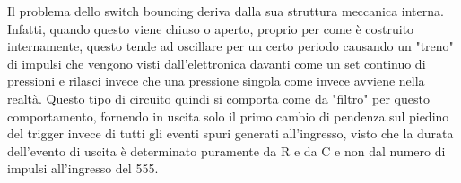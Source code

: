 Il problema dello switch bouncing deriva dalla sua struttura meccanica interna. Infatti, quando questo viene chiuso o aperto, proprio per come è costruito internamente, questo tende ad oscillare per un certo periodo causando un "treno" di impulsi che vengono visti dall'elettronica davanti come un set continuo di pressioni e rilasci invece che una pressione singola come invece avviene nella realtà. Questo tipo di circuito quindi si comporta come da "filtro" per questo comportamento, fornendo in uscita solo il primo cambio di pendenza sul piedino del trigger invece di tutti gli eventi spuri generati all'ingresso, visto che la durata dell'evento di uscita è determinato puramente da R e da C e non dal numero di impulsi all'ingresso del 555.